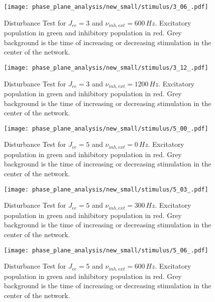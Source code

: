 \documentclass[a4paper,12pt]{article}
\begin{document}
    \begin{figure}
    \centering
        \texttt{[image: phase\_plane\_analysis/new\_small/stimulus/3\_06\_.pdf]}
        \caption{
            Disturbance Test for $J_{ee} = 3$ and $\nu_{inh,ext} = 600 \,\si{Hz}$.
            Excitatory population in green and inhibitory population in red. 
            Grey background is the time of increasing or decreasing stimulation 
            in the center of the network.
            }
    \end{figure}
    
    \begin{figure}
    \centering
        \texttt{[image: phase\_plane\_analysis/new\_small/stimulus/3\_12\_.pdf]}
        \caption{
            Disturbance Test for $J_{ee} = 3$ and $\nu_{inh,ext} = 1200 \,\si{Hz}$.
            Excitatory population in green and inhibitory population in red. 
            Grey background is the time of increasing or decreasing stimulation 
            in the center of the network.
            }
    \end{figure}
    
    \begin{figure}
    \centering
        \texttt{[image: phase\_plane\_analysis/new\_small/stimulus/5\_00\_.pdf]}
        \caption{
            Disturbance Test for $J_{ee} = 5$ and $\nu_{inh,ext} = 0 \,\si{Hz}$.
            Excitatory population in green and inhibitory population in red. 
            Grey background is the time of increasing or decreasing stimulation 
            in the center of the network.
            }
    \end{figure}
    
    \begin{figure}
    \centering
        \texttt{[image: phase\_plane\_analysis/new\_small/stimulus/5\_03\_.pdf]}
        \caption{
            Disturbance Test for $J_{ee} = 5$ and $\nu_{inh,ext} = 300 \,\si{Hz}$.
            Excitatory population in green and inhibitory population in red. 
            Grey background is the time of increasing or decreasing stimulation 
            in the center of the network.
            }
    \end{figure}
    
    \begin{figure}
    \centering
        \texttt{[image: phase\_plane\_analysis/new\_small/stimulus/5\_06\_.pdf]}
        \caption{
            Disturbance Test for $J_{ee} = 5$ and $\nu_{inh,ext} = 600 \,\si{Hz}$.
            Excitatory population in green and inhibitory population in red. 
            Grey background is the time of increasing or decreasing stimulation 
            in the center of the network.
            }
    \end{figure}
    
\end{document}
